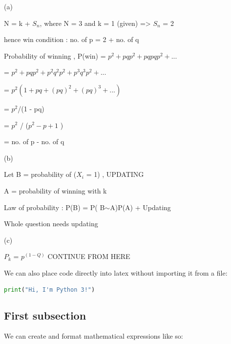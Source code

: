 \documentclass[a4paper,12pt]{article} %
\begin{document}
(a)

\centerline {N = k + $S_n$, where N = 3 and k = 1 (given) => $S_n$ = 2}
\centerline {hence win condition : no. of p = 2 + no. of q}
\vspace{5mm}
\centerline {Probability of winning , P(win) = $p^2 + pqp^2 + pqpqp^2 +...$}
\centerline {= $p^2 + pqp^2 + p^2q^2p^2 + p^3q^3p^2 + ...$}
\centerline{= $p^2(1 + pq + (pq)^2 + (pq)^3 + ... )$}
\centerline {= $p^2$/(1 - pq)}
\centerline {= $p^2$ / ($p^2 - p + 1$ )}
\centerline {= no. of p - no. of q}

\vspace{5mm}

(b)

\centerline{Let B = probability of ($X_i$ = 1) , UPDATING}

\centerline{A = probability of winning with k}

\centerline{Law of probability : P(B) = P( B$\sim$A)P(A) + Updating}

\centerline{Whole question needs updating}

\vspace{5mm}
(c)

\centerline{$P_k$ = $p^(1-Q)$ CONTINUE FROM HERE}



















\clearpage

\noindent
We can also place code directly into latex without importing it from a file:

\vspace{5mm}
\begin{lstlisting}[language=Python]
print("Hi, I'm Python 3!")
\end{lstlisting}
\vspace{5mm}

\subsection{First subsection} %

We can create and format mathematical expressions like so:
\end{document}
